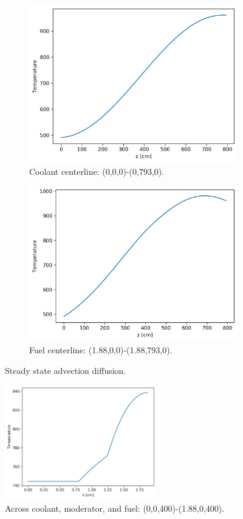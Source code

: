 \documentclass[11pt,letterpaper]{article}
\begin{document}
	\begin{figure}[htbp!]
		\centering
		\begin{subfigure}[t]{0.4\textwidth}
			\centering
			\includegraphics[width=\linewidth]{cg-advec4-ssA}
			\caption{Coolant centerline: (0,0,0)-(0,793,0).}
		\end{subfigure}
		\begin{subfigure}[t]{0.4\textwidth}
			\centering
	        \includegraphics[width=\linewidth]{cg-advec4-ssB}
			\caption{Fuel centerline: (1.88,0,0)-(1.88,793,0).}
		\end{subfigure}
		\hfill
		\caption{Steady state advection diffusion.}
		\label{fig:cg-advec4-ssA}
	\end{figure}

	\begin{figure}[htbp!]
		\centering
		\includegraphics[height=5cm]{cg-advec4-ssC}
		\caption{Across coolant, moderator, and fuel: (0,0,400)-(1.88,0,400).}
		\label{fig:cg-advec4-ssB}
	\end{figure}

\pagebreak


\end{document}
